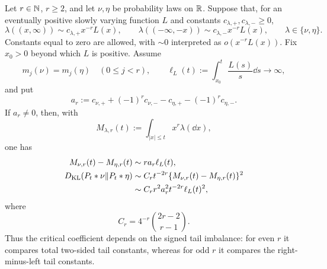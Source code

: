 \begin{theorem}
\label{thm:two-law-critical-moment-square-law}
Let \(r\in\mathbb{N}\), \(r\ge2\), and let \(\nu,\eta\) be probability laws on \(\mathbb{R}\).  Suppose
that, for an eventually positive slowly varying function \(L\) and constants
\(c_{\lambda,+},c_{\lambda,-}\ge0\),
\begin{equation}\label{eq:two-law-critical-tail-hypotheses}
 \lambda((x,\infty))\sim c_{\lambda,+}x^{-r}L(x),
 \qquad
 \lambda(({-\infty},-x))\sim c_{\lambda,-}x^{-r}L(x),
 \qquad \lambda\in\{\nu,\eta\}.
\end{equation}
Constants equal to zero are allowed, with \(\sim0\) interpreted as
\(o(x^{-r}L(x))\).  Fix \(x_0>0\) beyond which \(L\) is positive.  Assume
\[
 m_j(\nu)=m_j(\eta)\quad(0\le j<r),
 \qquad
 \ell_L(t):=\int_{x_0}^t\frac{L(s)}s\dd s\longrightarrow\infty,
\]
and put
\begin{equation}\label{eq:two-law-critical-tail-imbalance}
 a_r:=c_{\nu,+}+(-1)^rc_{\nu,-}
      -c_{\eta,+}-(-1)^rc_{\eta,-}.
\end{equation}
If \(a_r\ne0\), then, with
\[
 M_{\lambda,r}(t):=
 \int_{|x|\le t}x^r\lambda(\dd x),
 \]
one has
\begin{align}
 M_{\nu,r}(t)-M_{\eta,r}(t)
 &\sim r a_r\ell_L(t),
 \label{eq:two-law-critical-truncated-moment}\\
 D_{\rm KL}(P_t*\nu\|P_t*\eta)
 &\sim C_r t^{-2r}
 \{M_{\nu,r}(t)-M_{\eta,r}(t)\}^2
 \label{eq:two-law-critical-square-law}\\
 &\sim C_r r^2a_r^2t^{-2r}\ell_L(t)^2,
 \notag
\end{align}
where
\[
 C_r=4^{-r}\binom{2r-2}{r-1}.
\]
Thus the critical coefficient depends on the signed tail imbalance: for
even \(r\) it compares total two-sided tail constants, whereas for odd
\(r\) it compares the right-minus-left tail constants.
\end{theorem}

